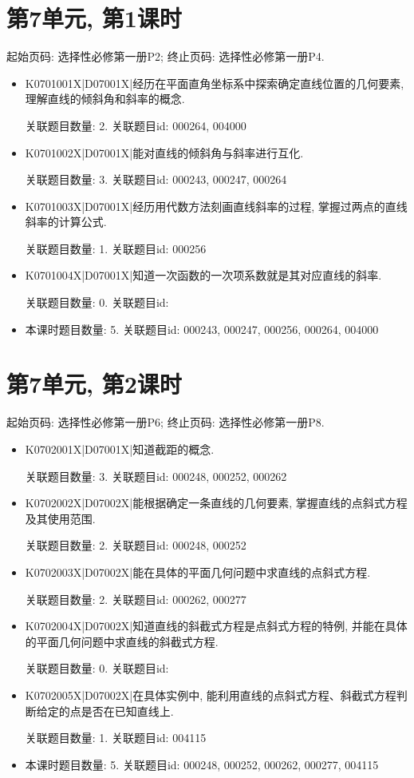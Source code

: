 \section*{第7单元, 第1课时}
起始页码: 选择性必修第一册P2; 终止页码: 选择性必修第一册P4.
\begin{itemize}
\item K0701001X|D07001X|经历在平面直角坐标系中探索确定直线位置的几何要素, 理解直线的倾斜角和斜率的概念.

关联题目数量: 2. 关联题目id: 000264, 004000

\item K0701002X|D07001X|能对直线的倾斜角与斜率进行互化.

关联题目数量: 3. 关联题目id: 000243, 000247, 000264

\item K0701003X|D07001X|经历用代数方法刻画直线斜率的过程, 掌握过两点的直线斜率的计算公式.

关联题目数量: 1. 关联题目id: 000256

\item K0701004X|D07001X|知道一次函数的一次项系数就是其对应直线的斜率.

关联题目数量: 0. 关联题目id: 

\item 本课时题目数量: 5. 关联题目id: 000243, 000247, 000256, 000264, 004000

\end{itemize}

\section*{第7单元, 第2课时}
起始页码: 选择性必修第一册P6; 终止页码: 选择性必修第一册P8.
\begin{itemize}
\item K0702001X|D07001X|知道截距的概念.

关联题目数量: 3. 关联题目id: 000248, 000252, 000262

\item K0702002X|D07002X|能根据确定一条直线的几何要素, 掌握直线的点斜式方程及其使用范围.

关联题目数量: 2. 关联题目id: 000248, 000252

\item K0702003X|D07002X|能在具体的平面几何问题中求直线的点斜式方程.

关联题目数量: 2. 关联题目id: 000262, 000277

\item K0702004X|D07002X|知道直线的斜截式方程是点斜式方程的特例, 并能在具体的平面几何问题中求直线的斜截式方程.

关联题目数量: 0. 关联题目id: 

\item K0702005X|D07002X|在具体实例中, 能利用直线的点斜式方程、斜截式方程判断给定的点是否在已知直线上.

关联题目数量: 1. 关联题目id: 004115

\item 本课时题目数量: 5. 关联题目id: 000248, 000252, 000262, 000277, 004115

\end{itemize}

